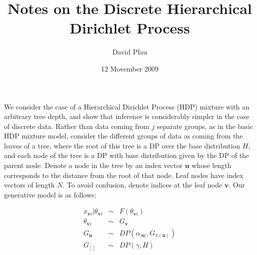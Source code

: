 \documentclass[11pt]{article}
\title{Notes on the Discrete Hierarchical Dirichlet Process}
\author{David Pfau}
\date{12 Movember 2009}                                           %
\begin{document}
\maketitle

We consider the case of a Hierarchical Dirichlet Process (HDP) mixture with an arbitrary tree depth, and show that inference is considerably simpler in the case of discrete data.  Rather than data coming from $j$ separate groups, as in the basic HDP mixture model, consider the different groups of data as coming from the leaves of a tree, where the root of this tree is a DP over the base distribution $H$, and each node of the tree is a DP with base distribution given by the DP of the parent node.  Denote a node in the tree by an index vector $\mathbf{u}$ whose length corresponds to the distance from the root of that node.  Leaf nodes have index vectors of length $N$.  To avoid confusion, denote indices at the leaf node $\mathbf{v}$.  Our generative model is as follows:

\begin{eqnarray}
x_{\mathbf{v}i} | \theta_{\mathbf{v}i} & \sim & F(\theta_{\mathbf{v}i}) \nonumber \\
\theta_{\mathbf{v}i} & \sim & G_{\mathbf{v}} \nonumber \\
G_{\mathbf{u}} & \sim & DP(\alpha_{|\mathbf{u}|}, G_{\pi(\mathbf{u})}) \nonumber \\
G_{[]} & \sim & DP(\gamma,H)
\end{eqnarray}
\end{document}
